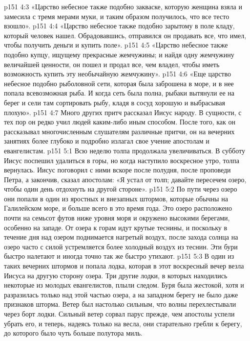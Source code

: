\vs p151 4:3 \pc «Царство небесное также подобно закваске, которую женщина взяла и замесила с тремя мерами муки, и таким образом получилось, что все тесто взошло».
\vs p151 4:4 \pc «Царство небесное также подобно зарытому в поле кладу, который человек нашел. Обрадовавшись, отправился он продавать все, что имел, чтобы получить деньги и купить поле».
\vs p151 4:5 \pc «Царство небесное также подобно купцу, ищущему прекрасные жемчужины; и найдя одну жемчужину величайшей ценности, он пошел и продал все, чем владел, чтобы иметь возможность купить эту необычайную жемчужину».
\vs p151 4:6 \pc «Еще царство небесное подобно рыболовной сети, которая была заброшена в море, и в нее попала всевозможная рыба. И когда сеть была полна, рыбаки вытянули ее на берег и сели там сортировать рыбу, кладя в сосуд хорошую и выбрасывая плохую».
\vs p151 4:7 \pc Много других притч рассказал Иисус народу. В сущности, с тех пор он редко учил людей каким\hyp{}либо иным способом. После того, как он рассказывал многочисленным слушателям различные притчи, он на вечерних занятиях более глубоко и подробно излагал свое учение апостолам и евангелистам.
\vs p151 5:1 Всю неделю толпа продолжала увеличиваться. В субботу Иисус поспешил удалиться в горы, но когда наступило воскресное утро, толпа вернулась. Иисус поговорил с ними вскоре после полудня, после проповеди Петра, а закончив, сказал апостолам: «Я устал от толп; давайте пересечем озеро, чтобы один день отдохнуть на другой стороне».
\vs p151 5:2 По пути через озеро они попали в один из яростных и внезапных штормов, которые обычны на Галилейском море, и больше всего в это время года. Это озеро расположено почти на семьсот футов ниже уровня моря и окружено высокими берегами, особенно на западе. От озера к горам идут крутые теснины, и поскольку в течение дня над озером поднимается нагретый воздух, после захода солнца на озеро часто с силой устремляется более холодный воздух из теснин. Эти бури быстро налетают и иногда точно так же быстро утихают.
\vs p151 5:3 В один из таких вечерних штормов и попала лодка, которая в этот воскресный вечер везла Иисуса на другую сторону озера. Три другие лодки, в которых находились некоторые из молодых евангелистов, плыли следом. Буря была жестокой, хотя и разразилась только над этой частью озера, а на западном берегу не было даже признаков шторма. Ветер был настолько сильным, что волны перехлестывали через борт лодки. Сильный ветер сорвал парус прежде, чем апостолы успели убрать его, и теперь, надеясь только на весла, они старательно гребли к берегу, до которого было чуть больше полутора миль.
